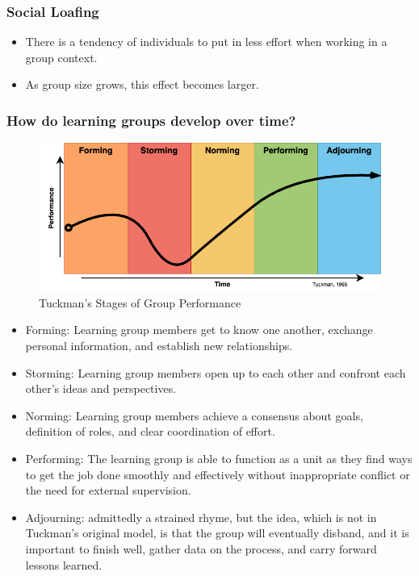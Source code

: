 \documentclass[
]{book}
\providecommand{\tightlist}{%
  \setlength{\itemsep}{0pt}\setlength{\parskip}{0pt}}
\begin{document}
\hypertarget{social-loafing}{%
\subsubsection*{Social Loafing}\label{social-loafing}}

\begin{itemize}
\tightlist
\item
  There is a tendency of individuals to put in less effort when working in a group context.
\item
  As group size grows, this effect becomes larger.
\end{itemize}

\hypertarget{how-do-learning-groups-develop-over-time}{%
\subsubsection*{How do learning groups develop over time?}\label{how-do-learning-groups-develop-over-time}}

\begin{figure}
\centering
\includegraphics{assets/presentations/facilitation/tuckman.drawio.png}
\caption{Tuckman's Stages of Group Performance}
\end{figure}

\begin{itemize}
\tightlist
\item
  Forming: Learning group members get to know one another, exchange personal information, and establish new relationships.
\item
  Storming: Learning group members open up to each other and confront each other's ideas and perspectives.
\item
  Norming: Learning group members achieve a consensus about goals, definition of roles, and clear coordination of effort.
\item
  Performing: The learning group is able to function as a unit as they find ways to get the job done smoothly and effectively without inappropriate conflict or the need for external supervision.
\item
  Adjourning: admittedly a strained rhyme, but the idea, which is not in Tuckman's original model, is that the group will eventually disband, and it is important to finish well, gather data on the process, and carry forward lessons learned.
\end{itemize}
\end{document}
